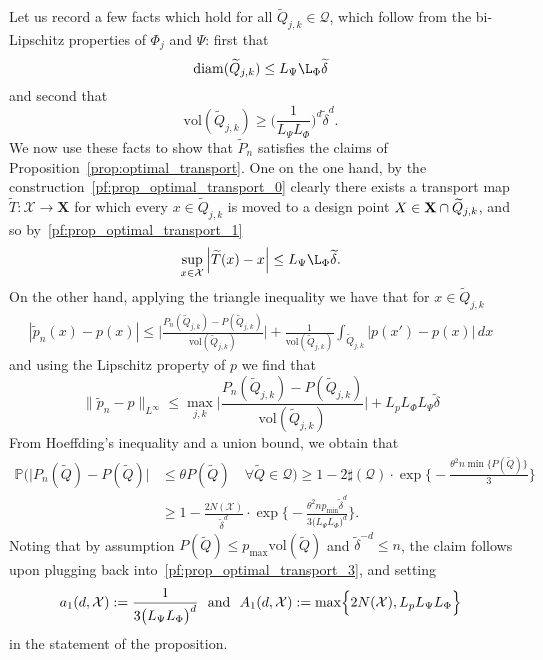\documentclass{article}
\newcommand{\abs}[1]{\left \lvert #1 \right \rvert}
\newcommand{\diam}{\mathrm{diam}}
\newcommand{\vol}{\text{vol}}
\newcommand{\1}{\mathbf{1}}
\newcommand{\Xset}{\mathcal{X}}
\newcommand{\Leb}{L}
\newcommand{\mc}[1]{\mathcal{#1}}
\newcommand{\wt}[1]{\widetilde{#1}}
\theoremstyle{alden}
\theoremstyle{aldenthm}
\theoremstyle{definition}
\theoremstyle{remark}
\begin{document}
Let us record a few facts which hold for all $\wt{Q}_{j,k} \in \mc{Q}$, which follow from the bi-Lipschitz properties of $\Phi_j$ and $\Psi$: first that
\begin{equation}
\label{pf:prop_optimal_transport_1}
\diam(\wt{Q}_{j,k}) \leq L_{\Psi} \L_{\Phi} \wt{\delta}
\end{equation}
and second that
\begin{equation}
\label{pf:prop_optimal_transport_2}
\vol(\wt{Q}_{j,k}) \geq \biggl(\frac{1}{L_{\Psi} L_{\Phi}}\biggr)^d \wt{\delta}^d.
\end{equation}
We now use these facts to show that $\wt{P}_n$ satisfies the claims of Proposition~\ref{prop:optimal_transport}. One on the one hand, by the construction~\eqref{pf:prop_optimal_transport_0} clearly there exists a transport map $\wt{T}: \Xset \to \mathbf{X}$ for which every $x \in \wt{Q}_{j,k}$ is moved to a design point $X \in {\bf X} \cap \wt{Q}_{j,k}$, and so by~\eqref{pf:prop_optimal_transport_1}
\begin{equation*}
\sup_{x \in \Xset} \abs{\wt{T}(x) - x} \leq  L_{\Psi} \L_{\Phi} \wt{\delta}.
\end{equation*}
On the other hand, applying the triangle inequality we have that for $x \in \wt{Q}_{j,k}$
\begin{align*}
|\wt{p}_n(x) - p(x)| \leq \biggl|\frac{P_n(\wt{Q}_{j,k}) - P(\wt{Q}_{j,k})}{\vol(\wt{Q}_{j,k})}\biggr| + \frac{1}{\vol(\wt{Q}_{j,k})} \int_{\wt{Q}_{j,k}} |p(x') - p(x)| \,dx 
\end{align*}
and using the Lipschitz property of $p$ we find that 
\begin{equation}
\label{pf:prop_optimal_transport_3}
\|\wt{p}_n - p\|_{\Leb^{\infty}} \leq \max_{j,k} \biggl|\frac{P_n(\wt{Q}_{j,k}) - P(\wt{Q}_{j,k})}{\vol(\wt{Q}_{j,k})}\biggr| + L_p L_{\Phi} L_{\Psi} \wt{\delta}
\end{equation}
From Hoeffding's inequality and a union bound, we obtain that 
\begin{align*}
\mathbb{P}\biggl( \bigl|P_n(\wt{Q}) - P(\wt{Q})\bigr| & \leq \theta P(\wt{Q}) \quad \forall \wt{Q} \in \mc{Q} \biggr) \geq 1 - 2 \sharp(\mc{Q}) \cdot \exp\biggl\{-\frac{\theta^2 n \min \{P(\wt{Q})\}}{3}\biggr\} \\
& \geq 1 - \frac{2 N(\Xset)}{\wt{\delta}^d} \cdot \exp\biggl\{-\frac{\theta^2 n p_{\min} \wt{\delta}^d }{3\bigl(L_{\Psi} L_{\Phi}\bigr)^d}\biggr\}.
\end{align*}
Noting that by assumption $P(\wt{Q}) \leq p_{\max} \vol(\wt{Q})$ and $\wt{\delta}^{-d} \leq n$, the claim follows upon plugging back into~\eqref{pf:prop_optimal_transport_3}, and setting
\begin{equation*}
a_1(d, \Xset) := \frac{1}{3\bigl(L_{\Psi} L_{\Phi}\bigr)^d}~~\textrm{and}~~A_1(d,\Xset) := \max \Bigl\{2N(\Xset),L_p L_{\Psi} L_{\Phi} \Bigr\}
\end{equation*}
in the statement of the proposition.
\end{document}
